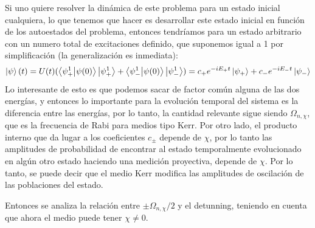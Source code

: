 Si uno quiere resolver la dinámica de este problema para un estado inicial cualquiera, lo que tenemos que hacer es desarrollar este estado inicial en función de los autoestados del problema, entonces tendríamos para un estado arbitrario con un numero total de excitaciones definido, que suponemos igual a 1 por simplificación (la generalización es inmediata):
\begin{equation}
    \ket{\psi}(t)=U(t)(\braket{\psi_+^1}{\psi(0)}\ket{\psi_+^1}+\braket{\psi_-^1}{\psi(0)}\ket{\psi_-^1})=c_+e^{-iE_+t}\ket{\psi_+}+c_-e^{-iE_-t}\ket{\psi_-}
\end{equation}
Lo interesante de esto es que podemos sacar de factor común alguna de las dos energías, y entonces lo importante para la evolución temporal del sistema es la diferencia entre las energías, por lo tanto, la cantidad relevante sigue siendo $\Omega_{n,\chi}$, que es la frecuencia de Rabi para medios tipo Kerr. Por otro lado, el producto interno que da lugar a los coeficientes $c_\pm$ depende de $\chi$, por lo tanto las amplitudes de probabilidad de encontrar al estado temporalmente evolucionado en algún otro estado haciendo una medición proyectiva, depende de $\chi$. Por lo tanto, se puede decir que el medio Kerr modifica las amplitudes de oscilación de las poblaciones del estado.

Entonces se analiza la relación entre $\pm \Omega_{n,\chi}/2$ y el detunning, teniendo en cuenta que ahora el medio puede tener $\chi \neq 0$. 

